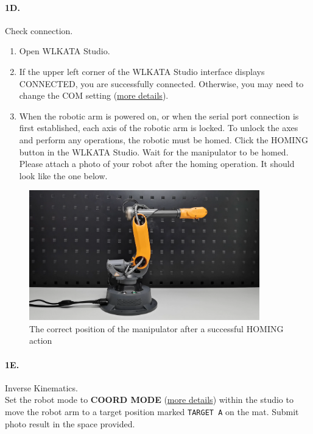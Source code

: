 \paragraph{1D.} Check connection.
\begin{enumerate} %
    \item Open WLKATA Studio.
    \item If the upper left corner of the WLKATA Studio interface displays CONNECTED, you are successfully connected. Otherwise, you may need to change the COM setting (\href{https://document.wlkata.com/?doc=/wlkata-mirobot-user-manual/12-quick-start-guide-of-mirobot/#header-three-6hmdl}{more details}).
    \item  When the robotic arm is powered on, or when the serial port connection is first established, each axis of the robotic arm is locked. To unlock the axes and perform any operations, the robotic must be homed. Click the HOMING button in the WLKATA Studio. Wait for the manipulator to be homed. Please attach a photo of your robot after the homing operation. It should look like the one below.
\end{enumerate}
\begin{figure}[H]
  \centering
  \vspace*{-0.0 in}
  \includegraphics[width=10cm]{image/post_homing.png}
  \caption*{The correct position of the manipulator after a successful HOMING action}
\end{figure}


\paragraph{1E.} Inverse Kinematics.\\
\noindent Set the robot mode to \textbf{COORD MODE} (\href{https://document.wlkata.com/?doc=/wlkata-mirobot-user-manual/12-quick-start-guide-of-mirobot/\#header-three-2mfvd}{more details}) within the studio to move the robot arm to a target position marked \texttt{TARGET A} on the mat.
Submit photo result in the space provided.



